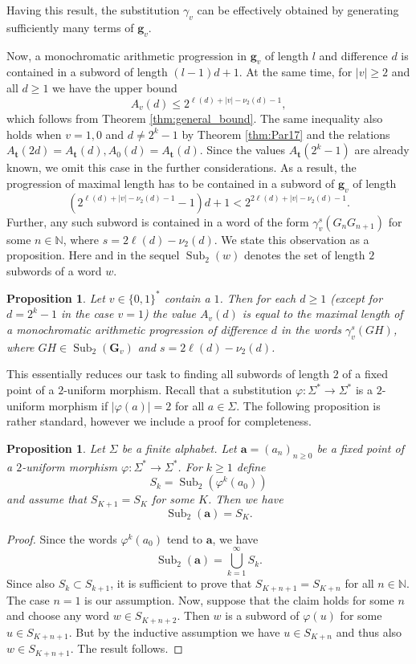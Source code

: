 \documentclass[a4paper,11pt]{amsart}
\newtheorem{prop}[thm]{Proposition}
\theoremstyle{definition}
\newcommand{\N}{\mathbb{N}}
\newcommand{\Sub}{\operatorname{Sub}}
\begin{document}
Having this result, the substitution $\gamma_v$ can be effectively obtained by generating sufficiently many terms of $\mathbf{g}_v$.

Now, a monochromatic arithmetic progression in $\mathbf{g}_v$ of length $l$ and difference $d$ is contained in a subword of length $(l-1)d+1$. At the same time, for $|v| \geq 2$ and all $d \geq 1$ we have the upper bound
\begin{equation} \label{eq:a_priori_bound}
A_v(d) \leq  2^{\ell(d)+|v|-\nu_2(d)-1},
\end{equation}
which follows from Theorem \ref{thm:general_bound}. The same inequality also holds when $v=1,0$ and $d \neq 2^k-1$ by Theorem \ref{thm:Par17} and the relations $A_{\mathbf{t}}(2d) = A_{\mathbf{t}}(d), A_0(d) = A_{\mathbf{t}}(d)$. Since the values $A_{\mathbf{t}}(2^k-1)$ are already known, we omit this case in the further considerations. As a result, the progression of maximal length has to be contained in a subword of $\mathbf{g}_v$ of length 
$$(2^{\ell(d)+|v|-\nu_2(d)-1}-1)d+1 < 2^{2\ell(d)+|v|-\nu_2(d)-1}.$$
Further, any such subword is contained in a word of the form $\gamma_v^{s}(G_n G_{n+1})$ for some $n \in \N$, where $s = 2 \ell(d) - \nu_2(d)$.
We state this observation as a proposition. Here and in the sequel $\Sub  _2(w)$ denotes the set of length $2$ subwords of a word $w$.
\begin{prop} \label{prop:progressions_in_subwords}
Let $v \in \{0,1\}^*$ contain a $1$. Then for each $d \geq 1$ (except for $d=2^k-1$ in the case $v=1$) the value $A_v(d)$ is equal to the maximal length of a monochromatic arithmetic progression of difference $d$ in the words $\gamma_v^s(GH)$, where $GH \in \Sub_2(\mathbf{G}_v)$ and $s = 2\ell(d)-\nu_2(d)$.
\end{prop}
This essentially reduces our task to finding all subwords of length $2$ of a fixed point of a $2$-uniform morphism. Recall that a substitution $\varphi \colon \Sigma^* \to \Sigma^*$ is a $2$-uniform morphism if $|\varphi(a)| = 2$ for all $a \in \Sigma$. The following proposition is rather standard, however we include a proof for completeness.

\begin{prop}
Let $\Sigma$ be a finite alphabet. Let $\mathbf{a} = (a_{n})_{n \geq 0}$ be a fixed point of a $2$-uniform morphism $\varphi \colon \Sigma^* \to \Sigma^*$. For $k \geq 1$ define
$$  S_k = \Sub_2(\varphi^k(a_0))$$ 
and assume that $S_{K+1} = S_{K}$ for some $K$. Then we have
$$\Sub_2(\mathbf{a})= S_K.$$
\end{prop}
\begin{proof}
Since the words $\varphi^k(a_0)$ tend to $\mathbf{a}$, we have
$$  \Sub_2(\mathbf{a}) = \bigcup_{k=1}^{\infty} S_k.  $$
Since also $S_k \subset S_{k+1}$, it is sufficient to prove that $S_{K+n+1} = S_{K+n}$ for all $n \in \N$. The case $n=1$ is our assumption. Now, suppose that the claim holds for some $n$ and choose any word $w \in S_{K+n+2}$. Then $w$ is a subword of $\varphi(u)$ for some $u \in S_{K+n+1}$. But by the inductive assumption we have $u \in S_{K+n}$ and thus also $  w \in S_{K+n+1}$. The result follows.
\end{proof}
\end{document}
